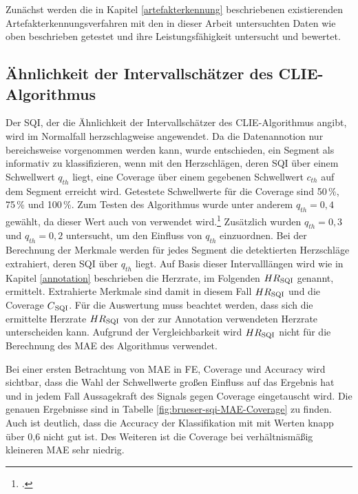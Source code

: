 Zunächst werden die in Kapitel \ref{artefakterkennung} beschriebenen existierenden Artefakterkennungsverfahren mit den in dieser Arbeit untersuchten Daten wie oben beschrieben getestet und ihre Leistungsfähigkeit untersucht und bewertet.

\subsection{Ähnlichkeit der Intervallschätzer des CLIE-Algorithmus}\label{eval-brueser}

Der \ac{SQI}, der die Ähnlichkeit der Intervallschätzer des \ac{CLIE}-Algorithmus angibt, wird im Normalfall herzschlagweise angewendet. Da die Datenannotion nur bereichsweise vorgenommen werden kann, wurde entschieden, ein Segment als informativ zu klassifizieren, wenn mit den Herzschlägen, deren \ac{SQI} über einem Schwellwert $q_{th}$ liegt, eine Coverage über einem gegebenen Schwellwert $c_{th}$ auf dem Segment erreicht wird. %
Getestete Schwellwerte für die Coverage sind 50\,\%, 75\,\% und 100\,\%. Zum Testen des Algorithmus wurde unter anderem $q_{th} = 0{,}4$ gewählt, da dieser Wert auch von \citeauthor{Zink2017} verwendet wird.\footcite[]{Zink2017} Zusätzlich wurden $q_{th} = 0{,}3$ und $q_{th} = 0{,}2$ untersucht, um den Einfluss von $q_{th}$ einzuordnen. Bei der Berechnung der Merkmale werden für jedes Segment die detektierten Herzschläge extrahiert, deren \ac{SQI} über $q_{th}$ liegt. Auf Basis dieser Intervalllängen wird wie in Kapitel \ref{annotation} beschrieben die Herzrate, im Folgenden $HR\textsubscript{SQI}$ genannt, ermittelt. Extrahierte Merkmale sind damit in diesem Fall $HR\textsubscript{SQI}$ und die Coverage $C\textsubscript{SQI}$. Für die Auswertung muss beachtet werden, dass sich die ermittelte Herzrate $HR\textsubscript{SQI}$ von der zur Annotation verwendeten Herzrate unterscheiden kann. Aufgrund der Vergleichbarkeit wird $HR\textsubscript{SQI}$ nicht für die Berechnung des \ac{MAE} des Algorithmus verwendet.

Bei einer ersten Betrachtung von \ac{MAE} in \si{FE}, Coverage und Accuracy wird sichtbar, dass die Wahl der Schwellwerte großen Einfluss auf das Ergebnis hat und in jedem Fall Aussagekraft des Signals gegen Coverage eingetauscht wird. Die genauen Ergebnisse sind in Tabelle \ref{fig:brueser-sqi-MAE-Coverage} zu finden. Auch ist deutlich, dass die Accuracy der Klassifikation mit mit Werten knapp über 0{,}6 nicht gut ist. Des Weiteren ist die Coverage bei verhältnismäßig kleineren \ac{MAE} sehr niedrig.
 

